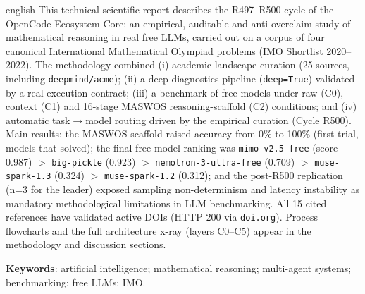 \begin{resumo}[Abstract]
\begin{otherlanguage*}{english}
This technical-scientific report describes the R497--R500 cycle of the
OpenCode Ecosystem Core: an empirical, auditable and anti-overclaim study of
mathematical reasoning in real free LLMs, carried out on a corpus of four
canonical International Mathematical Olympiad problems (IMO Shortlist
2020--2022). The methodology combined (i) academic landscape curation (25
sources, including \texttt{deepmind/acme}); (ii) a deep diagnostics pipeline
(\texttt{deep=True}) validated by a real-execution contract; (iii) a
benchmark of free models under raw (C0), context (C1) and 16-stage MASWOS
reasoning-scaffold (C2) conditions; and (iv) automatic task$\rightarrow$model
routing driven by the empirical curation (Cycle R500). Main results: the
MASWOS scaffold raised accuracy from 0\% to 100\% (first trial, models that
solved); the final free-model ranking was \texttt{mimo-v2.5-free} (score
0.987) $>$ \texttt{big-pickle} (0.923) $>$ \texttt{nemotron-3-ultra-free}
(0.709) $>$ \texttt{muse-spark-1.3} (0.324) $>$ \texttt{muse-spark-1.2}
(0.312); and the post-R500 replication (n=3 for the leader) exposed sampling
non-determinism and latency instability as mandatory methodological
limitations in LLM benchmarking. All 15 cited references have validated
active DOIs (HTTP 200 via \texttt{doi.org}). Process flowcharts and the full
architecture x-ray (layers C0--C5) appear in the methodology and discussion
sections.
\end{otherlanguage*}
\textbf{Keywords}: artificial intelligence; mathematical reasoning;
multi-agent systems; benchmarking; free LLMs; IMO.
\end{resumo}